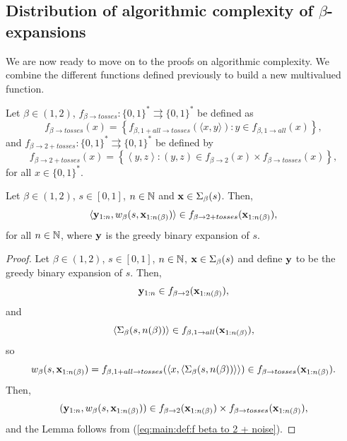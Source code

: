 \subsection{\texorpdfstring{Distribution of algorithmic complexity of $\beta$-expansions}{}}
We are now ready to move on to the proofs on algorithmic complexity. We combine the different functions defined previously to build a new multivalued function.
\begin{definition}\label{def:f beta to 2 + noise}
    Let $\beta \in (1,2)$, $f_{\beta \to tosses} : \{0,1\}^\ast \rightrightarrows \{0,1\}^\ast$ be defined as 
    \begin{equation}
        f_{\beta \to tosses}(x) = \left\{ f_{\beta,1+all\to tosses}(\langle x, y\rangle) : y \in f_{\beta, 1 \to all}(x)\right\},
    \end{equation}
    and $f_{\beta \to 2+tosses} : \{0,1\}^\ast \rightrightarrows \{0,1\}^\ast$ be defined by 
    \begin{equation}\label{eq:main:def:f beta to 2 + noise}
        f_{\beta \to 2+tosses}(x) = \left\{ \left\langle y,z \right\rangle : (y,z) \in f_{\beta \to 2}(x) \times f_{\beta \to tosses}(x) \right\},
    \end{equation}
    for all $x \in \{0,1\}^\ast$.
\end{definition}
\begin{lemma}
    Let $\beta \in (1,2)$, $s \in [0,1]$, $n \in \mathbb{N}$ and ${\bf x} \in \Sigma_\beta(s)$. Then,
    \begin{equation}
        \langle {\bf y}_{1:n}, w_\beta(s,{\bf x}_{1:n(\beta)})\rangle \in f_{\beta \to 2+tosses}({\bf x}_{1:n(\beta)}),
    \end{equation}
    for all $n \in \mathbb{N}$, where ${\bf y}$ is the greedy binary expansion of $s$.
\end{lemma}
\begin{proof}
    Let $\beta \in (1,2)$, $s \in [0,1]$, $n \in \mathbb{N}$, ${\bf x} \in \Sigma_\beta(s)$ and define ${\bf y}$ to be the greedy binary expansion of $s$. Then,
    \begin{equation}
        {\bf y}_{1:n} \in f_{\beta \to 2}({\bf x}_{1:n(\beta)}),
    \end{equation}
    and 
    \begin{equation}
        \langle \Sigma_\beta(s, n(\beta)) \rangle \in f_{\beta, 1 \to all}({\bf x}_{1:n(\beta)}),
    \end{equation}
    so 
    \begin{equation}
        w_\beta(s, {\bf x}_{1:n(\beta)}) = f_{\beta,1+all\to tosses}(\langle x, \langle \Sigma_\beta(s,n(\beta))\rangle\rangle) \in f_{\beta \to tosses}({\bf x}_{1:n(\beta)}).
    \end{equation}
    Then,
    \begin{equation}
        ({\bf y}_{1:n}, w_\beta(s, {\bf x}_{1:n(\beta)})) \in f_{\beta \to 2}({\bf x}_{1:n(\beta)}) \times f_{\beta \to tosses}({\bf x}_{1:n(\beta)}),
    \end{equation}
    and the Lemma follows from (\ref{eq:main:def:f beta to 2 + noise}).
\end{proof}
